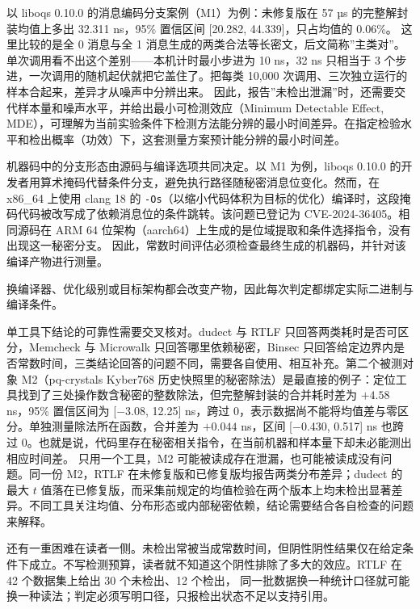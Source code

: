 以 liboqs 0.10.0 的消息编码分支案例（M1）为例：未修复版在 57 µs 的完整解封装均值上多出 32.311 ns，95\% 置信区间 [20.282, 44.339]，只占均值的 0.06\%。%
这里比较的是全 0 消息与全 1 消息生成的两类合法等长密文，后文简称”主类对”。单次调用看不出这个差别——本机计时最小步进为 10 ns，32 ns 只相当于 3 个步进，一次调用的随机起伏就把它盖住了。把每类 10,000 次调用、三次独立运行的样本合起来，差异才从噪声中分辨出来。%
因此，报告”未检出泄漏”时，还需要交代样本量和噪声水平，并给出最小可检测效应（Minimum Detectable Effect, MDE），可理解为当前实验条件下检测方法能分辨的最小时间差异。在指定检验水平和检出概率（功效）下，这套测量方案预计能分辨的最小时间差。

机器码中的分支形态由源码与编译选项共同决定。以 M1 为例，liboqs 0.10.0 的开发者用算术掩码代替条件分支，避免执行路径随秘密消息位变化。然而，在 x86\_64 上使用 clang 18 的 \texttt{-Os}（以缩小代码体积为目标的优化）编译时，这段掩码代码被改写成了依赖消息位的条件跳转。该问题已登记为 CVE-2024-36405\cite{ghsa-f2v9}。相同源码在 ARM 64 位架构（aarch64）上生成的是位域提取和条件选择指令，没有出现这一秘密分支。%
因此，常数时间评估必须检查最终生成的机器码，并针对该编译产物进行测量。

换编译器、优化级别或目标架构都会改变产物，因此每次判定都绑定实际二进制与编译条件。

单工具下结论的可靠性需要交叉核对。dudect 与 RTLF 只回答两类耗时是否可区分\cite{dudect,rtlf}，Memcheck 与 Microwalk 只回答哪里依赖秘密\cite{ctgrind,microwalk}，Binsec 只回答给定边界内是否常数时间\cite{binsec}，三类结论回答的问题不同，需要各自使用、相互补充。第二个被测对象 M2（pq-crystals Kyber768 历史快照里的秘密除法）是最直接的例子：定位工具找到了三处操作数含秘密的整数除法，但完整解封装的合并耗时差为 $+4.58$ ns，95\% 置信区间为 [$-$3.08, 12.25] ns，跨过 0，表示数据尚不能将均值差与零区分。单独测量除法所在函数，合并差为 $+0.044$ ns，区间 [$-$0.430, 0.517] ns 也跨过 0。也就是说，代码里存在秘密相关指令，在当前机器和样本量下却未必能测出相应时间差。%
只用一个工具，M2 可能被读成存在泄漏，也可能被读成没有问题。同一份 M2，RTLF 在未修复版和已修复版均报告两类分布差异；dudect 的最大 $t$ 值落在已修复版，而采集前规定的均值检验在两个版本上均未检出显著差异。不同工具关注均值、分布形态或内部秘密依赖，结论需要结合各自检查的问题来解释。

还有一重困难在读者一侧。未检出常被当成常数时间，但阴性阴性结果仅在给定条件下成立。不写检测预算，读者就不知道这个阴性排除了多大的效应。RTLF 在 42 个数据集上给出 30 个未检出、12 个检出\cite{rtlf}，%
同一批数据换一种统计口径就可能换一种读法；判定必须写明口径，只报检出状态不足以支持引用。

